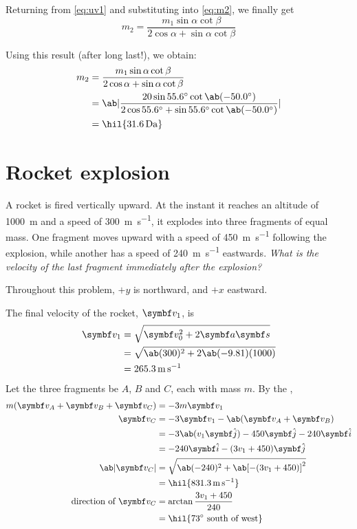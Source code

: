 Returning from \cref{eq:uv1} and substituting into \cref{eq:m2}, we finally get
\begin{equation}
  m_2 = \dfrac{m_1\sin\alpha\cot\beta}{2\cos\alpha + \sin\alpha\cot\beta}
\end{equation}

Using this result (after long last!), we obtain:
\begin{align*}
  m_2 &= \dfrac{m_1\sin\alpha\cot\beta}{2\cos\alpha + \sin\alpha\cot\beta} \\
  &=
  \ab|\frac{20\sin\qty{55.6}{\degree}\cot\ab(\qty{-50.0}{\degree})}{2\cos\qty{55.6}{\degree}
  + \sin\qty{55.6}{\degree}\cot\ab(\qty{-50.0}{\degree})}| \\
  &= \hil{\qty{31.6}{\dalton}}
\end{align*}

\section{Rocket explosion}
A rocket is fired vertically upward. At the instant it reaches an
altitude of \qty{1000}{\metre} and a
speed of \qty{300}{\metre\per\second}, it explodes into three
fragments of equal mass. One fragment moves
upward with a speed of \qty{450}{\metre\per\second} following the
explosion, while another has a speed of
\qty{240}{\metre\per\second} eastwards. \it{What is the velocity of the
last fragment immediately after the explosion?}

Throughout this problem, \(+y\) is northward, and \(+x\) eastward.

The final velocity of the rocket, \(\mv{v}_1\), is
\begin{align*}
  \mv{v}_1 &= \sqrt{\mv{v}_0^2 + 2\mv{a}\mv{s}}\\
  &= \sqrt{\ab(300)^2 + 2\ab(-9.81)(1000)} \\
  &= \qty{265.3}{\metre\per\second}
\end{align*}
Let the three fragments be \(A\), \(B\) and \(C\), each with mass
\(m\). By the ,
\begin{align*}
  m(\mv{v}_A + \mv{v}_B + \mv{v}_C) &= -3m\mv{v}_1 \\
  \mv{v}_C &= -3\mv{v}_1 - \ab(\mv{v}_A + \mv{v}_B) \\
  &= -3\ab(v_1\jj) - 450\jj - 240\ii \\
  &= -240\ii - (3v_1 + 450)\jj \\
  \ab|\mv{v}_C| &= \sqrt{\ab(-240)^2 + \ab[-(3v_1+450)]^2}\\
  &= \hil{\qty{831.3}{\metre\per\second}} \\
  \text{direction of } \mv{v}_C &= \arctan\f{3v_1 +450}{240} \\
  &= \hil{\qty{73}{\degree}\text{ south of west}}
\end{align*}

